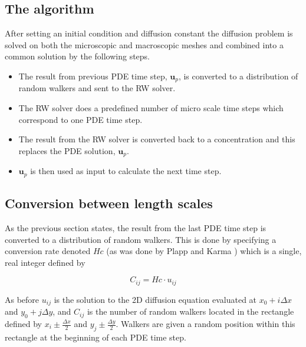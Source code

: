 \subsection{The algorithm}
After setting an initial condition and diffusion constant the diffusion problem is solved on both the microscopic and macroscopic meshes and combined into a common solution by the following steps.
\begin{itemize}
 \item The result from previous PDE time step, $\mathbf{u}_p$, is converted to a distribution of random walkers and sent to the RW solver.
 \item The RW solver does a predefined number of micro scale time steps which correspond to one PDE time step.
 \item The result from the RW solver is converted back to a concentration and this replaces the PDE solution, $\mathbf{u}_p$.
 \item $\mathbf{u}_p$ is then used as input to calculate the next time step.
\end{itemize}

\subsection{Conversion between length scales}
As the previous section states, the result from the last PDE time step is converted to a distribution of random walkers. 
This is done by specifying a conversion rate denoted $Hc$ (as was done by Plapp and Karma \cite{plapp2000multiscale}) which is a single, real integer defined by

\begin{equation}\label{theory:Hc_definition}
 C_{ij} = Hc\cdot u_{ij}
\end{equation}

\noindent As before $u_{ij}$ is the solution to the 2D diffusion equation evaluated at $x_0 +i\Delta x$ and $y_0 +j\Delta y$, and $C_{ij}$ is the number of random walkers located in the rectangle defined by $x_i\pm\frac{\Delta x}{2}$ and $y_j\pm\frac{\Delta y}{2}$. 
Walkers are given a random position within this rectangle at the beginning of each PDE time step.

